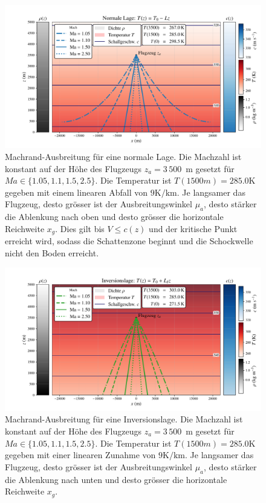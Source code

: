 \begin{figure}
    \centering
    \includegraphics[width=\textwidth]{papers/schall/figures/normal_sidepanels.pdf}
    \caption{Machrand-Ausbreitung für eine normale Lage. Die Machzahl
    ist konstant auf der Höhe des Flugzeugs $z_a=3\,500$\ m gesetzt für
    $\textit{Ma} \in \{1.05, 1.1, 1.5, 2.5 \}$.
    Die Temperatur ist $T(1500 m) = 285.0 \mathrm{K}$ gegeben mit einem
    linearen Abfall von $9 \mathrm{K/km}$.
    Je langsamer das Flugzeug, desto grösser ist der Ausbreitungswinkel
    $\mu_a$, desto stärker die Ablenkung nach oben und desto grösser
    die horizontale Reichweite $x_g$.
    Dies gilt bis $V\le c(z)$ und der kritische Punkt erreicht wird,
    sodass die Schattenzone beginnt und die Schockwelle nicht den
    Boden erreicht.}
    \label{fig:schall:norm-lage}
\end{figure}

\begin{figure}
    \centering
    \includegraphics[width=\textwidth]{papers/schall/figures/inversion_sidepanels.pdf}
    \caption{Machrand-Ausbreitung für eine Inversionslage. Die Machzahl
    ist konstant auf der Höhe des Flugzeugs $z_a=3\,500$\ m gesetzt für
    $\textit{Ma} \in \{1.05, 1.1, 1.5, 2.5 \}$.
    Die Temperatur ist $T(1500 m) = 285.0 \mathrm{K}$ gegeben mit einer
    linearen Zunahme von $9 \mathrm{K/km}$.
    Je langsamer das Flugzeug, desto grösser ist der Ausbreitungswinkel
    $\mu_a$, desto stärker die Ablenkung nach unten und desto
    grösser die horizontale Reichweite $x_g$.}
    \label{fig:schall:inv-lage}
\end{figure}

